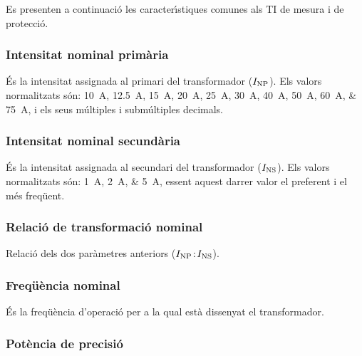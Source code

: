 Es presenten a continuaci\'{o} les caracter\'{\i}stiques comunes als TI de
mesura i de protecci\'{o}.

\subsubsection{Intensitat nominal prim\`{a}ria}

 \'{E}s la intensitat assignada al
primari del transformador ($I_\mathrm{NP}$). Els valors normalitzats
s\'{o}n: \SIlist{10; 12,5; 15; 20; 25;30; 40; 50; 60;75}{A}, i els
seus m\'{u}ltiples i subm\'{u}ltiples decimals.

\subsubsection{Intensitat nominal secund\`{a}ria}

 \'{E}s la intensitat assignada al
secundari del transformador ($I_\mathrm{NS}$). Els valors normalitzats
s\'{o}n: \SIlist{1;2;5}{A}, essent aquest darrer valor el
preferent i el m\'{e}s freq\"{u}ent.

\subsubsection{Relaci\'{o} de transformaci\'{o} nominal}

Relaci\'{o} dels dos  par\`{a}metres anteriors ($I_\mathrm{NP}\!:\!I_\mathrm{NS}$).

\subsubsection{Freq\"{u}\`{e}ncia nominal}

 \'{E}s la freq\"{u}\`{e}ncia d'operaci\'{o} per a la qual    est\`{a} dissenyat el transformador.

\subsubsection{Pot\`{e}ncia de precisi\'{o}}

